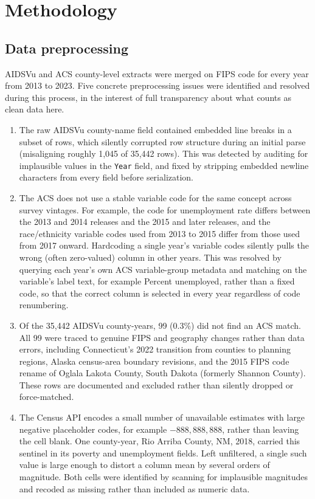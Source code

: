 \documentclass[11pt,letterpaper]{article}
\begin{document}
\section{Methodology}

\subsection{Data preprocessing}
AIDSVu and ACS county-level extracts were merged on FIPS code for every year from 2013 to 2023. Five concrete preprocessing issues were identified and resolved during this process, in the interest of full transparency about what counts as clean data here.

\begin{enumerate}[leftmargin=1.4em]
\item The raw AIDSVu county-name field contained embedded line breaks in a subset of rows, which silently corrupted row structure during an initial parse (misaligning roughly 1,045 of 35,442 rows). This was detected by auditing for implausible values in the \texttt{Year} field, and fixed by stripping embedded newline characters from every field before serialization.
\item The ACS does not use a stable variable code for the same concept across survey vintages. For example, the code for unemployment rate differs between the 2013 and 2014 releases and the 2015 and later releases, and the race/ethnicity variable codes used from 2013 to 2015 differ from those used from 2017 onward. Hardcoding a single year's variable codes silently pulls the wrong (often zero-valued) column in other years. This was resolved by querying each year's own ACS variable-group metadata and matching on the variable's label text, for example Percent unemployed, rather than a fixed code, so that the correct column is selected in every year regardless of code renumbering.
\item Of the 35,442 AIDSVu county-years, 99 (0.3\%) did not find an ACS match. All 99 were traced to genuine FIPS and geography changes rather than data errors, including Connecticut's 2022 transition from counties to planning regions, Alaska census-area boundary revisions, and the 2015 FIPS code rename of Oglala Lakota County, South Dakota (formerly Shannon County). These rows are documented and excluded rather than silently dropped or force-matched.
\item The Census API encodes a small number of unavailable estimates with large negative placeholder codes, for example $-888{,}888{,}888$, rather than leaving the cell blank. One county-year, Rio Arriba County, NM, 2018, carried this sentinel in its poverty and unemployment fields. Left unfiltered, a single such value is large enough to distort a column mean by several orders of magnitude. Both cells were identified by scanning for implausible magnitudes and recoded as missing rather than included as numeric data.

\end{enumerate}
\end{document}
